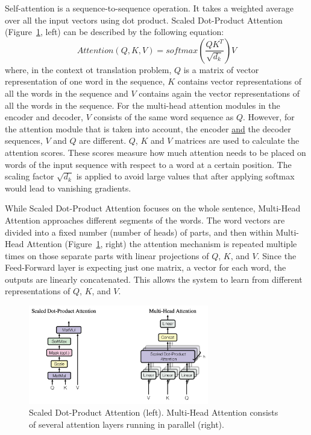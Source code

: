 Self-attention is a sequence-to-sequence operation.
It takes a weighted average over all the input vectors using dot product.
Scaled Dot-Product Attention (Figure~\ref{fig:trans_attn}, left) can be described by the following equation:
\begin{equation} \label{eq:1}
Attention(Q,K,V) = softmax(\frac{QK^T}{\sqrt{d_k}})V
\end{equation}
where, in the context ot translation problem,
$Q$ is a matrix of vector representation of one word in the sequence,
$K$ contains vector representations of all the words in the sequence and
$V$ contains again the vector representations of all the words in the sequence.
For the multi-head attention modules in the encoder and decoder,
$V$ consists of the same word sequence as $Q$.
However, for the attention module that is taken into account,
the encoder \underline{and} the decoder sequences, $V$ and $Q$ are different.
$Q$, $K$ and $V$ matrices are used to calculate the attention scores.
These scores measure how much attention needs
to be placed on words of the input sequence with respect to a word at a certain position.
The scaling factor $\sqrt{d_k}$ is applied to avoid large values that after 
applying softmax would lead to vanishing gradients.

While Scaled Dot-Product Attention focuses on the whole sentence, 
Multi-Head Attention approaches different segments of the words.
The word vectors are divided into a fixed number (number of heads) of parts,
and then within Multi-Head Attention (Figure~\ref{fig:trans_attn}, right) 
the attention mechanism is repeated multiple times on those separate parts with linear projections of $Q$, $K$, and $V$.
Since the Feed-Forward layer is expecting just one matrix, a vector for each word,
the outputs are linearly concatenated.
This allows the system to learn from different representations of $Q$, $K$, and $V$.

\begin{figure}[h] %
    \centering
    \includegraphics[width=0.7\textwidth]{figures/03_blocks_overview.png} %
    \caption{Scaled Dot-Product Attention (left). Multi-Head Attention consists of several attention layers running in parallel (right). \cite{vaswani2017attention}} %
    \label{fig:trans_attn} %
\end{figure} 

